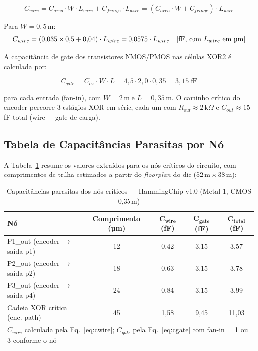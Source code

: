 \documentclass[12pt,a4paper]{article}
\begin{document}
\begin{equation}
  C_{wire} = C_{area} \cdot W \cdot L_{wire} + C_{fringe} \cdot L_{wire}
           = (C_{area} \cdot W + C_{fringe}) \cdot L_{wire}
  \label{eq:cwire}
\end{equation}

Para $W = 0{,}5$\,\textmu m:
\[
  C_{wire} = (0{,}035 \times 0{,}5 + 0{,}04) \cdot L_{wire}
           = 0{,}0575 \cdot L_{wire} \quad [\text{fF, com }L_{wire}\text{ em \textmu m}]
\]

A capacitância de gate dos transistores NMOS/PMOS nas células XOR2 é calculada por:

\begin{equation}
  C_{gate} = C_{ox} \cdot W \cdot L = 4{,}5 \cdot 2{,}0 \cdot 0{,}35 = 3{,}15\;\text{fF}
  \label{eq:cgate}
\end{equation}

para cada entrada (fan-in), com $W = 2$\,\textmu m e $L = 0{,}35$\,\textmu m. O caminho crítico do encoder percorre 3 estágios XOR em série, cada um com $R_{out} \approx 2\,\text{k}\Omega$ e $C_{out} \approx 15$\,fF total (wire + gate de carga).

\subsection{Tabela de Capacitâncias Parasitas por Nó}

A Tabela~\ref{tab:parasitics} resume os valores extraídos para os nós críticos do circuito, com comprimentos de trilha estimados a partir do \textit{floorplan} do die (52\,\textmu m\,$\times$\,38\,\textmu m):

\begin{table}[h!]
\centering
\caption{Capacitâncias parasitas dos nós críticos --- HammingChip v1.0 (Metal-1, CMOS 0,35\,\textmu m)}
\label{tab:parasitics}
\begin{tabular}{lcccc}
\toprule
\textbf{Nó} & \textbf{Comprimento (µm)} & $\bm{C_{wire}}$ \textbf{(fF)} & $\bm{C_{gate}}$ \textbf{(fF)} & $\bm{C_{total}}$ \textbf{(fF)} \\
\midrule
P1\_out (encoder $\to$ saída p1) & 12  & 0,42 & 3,15 & 3,57 \\
P2\_out (encoder $\to$ saída p2) & 18  & 0,63 & 3,15 & 3,78 \\
P3\_out (encoder $\to$ saída p4) & 24  & 0,84 & 3,15 & 3,99 \\
Cadeia XOR crítica (enc. path)   & 45  & 1,58 & 9,45 & 11,03 \\
\bottomrule
\multicolumn{5}{l}{\small $C_{wire}$ calculada pela Eq.~\eqref{eq:cwire}; $C_{gate}$ pela Eq.~\eqref{eq:cgate} com fan-in = 1 ou 3 conforme o nó}
\end{tabular}
\end{table}
\end{document}
